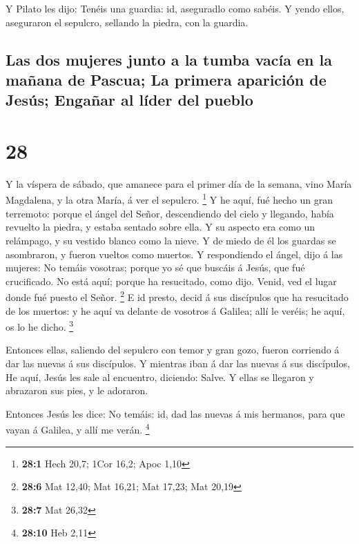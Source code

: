  Y Pilato les dijo: Tenéis una guardia: id, aseguradlo
como sabéis.  Y yendo ellos, aseguraron el sepulcro,
sellando la piedra, con la guardia.

\hypertarget{las-dos-mujeres-junto-a-la-tumba-vacuxeda-en-la-mauxf1ana-de-pascua-la-primera-apariciuxf3n-de-jesuxfas-engauxf1ar-al-luxedder-del-pueblo}{%
\subsection{Las dos mujeres junto a la tumba vacía en la mañana de
Pascua; La primera aparición de Jesús; Engañar al líder del
pueblo}\label{las-dos-mujeres-junto-a-la-tumba-vacuxeda-en-la-mauxf1ana-de-pascua-la-primera-apariciuxf3n-de-jesuxfas-engauxf1ar-al-luxedder-del-pueblo}}

\hypertarget{section-27}{%
\section{28}\label{section-27}}

 Y la víspera de sábado, que amanece para el primer día de
la semana, vino María Magdalena, y la otra María, á ver el sepulcro.
\footnote{\textbf{28:1} Hech 20,7; 1Cor 16,2; Apoc 1,10} 
Y he aquí, fué hecho un gran terremoto: porque el ángel del Señor,
descendiendo del cielo y llegando, había revuelto la piedra, y estaba
sentado sobre ella.  Y su aspecto era como un relámpago, y
su vestido blanco como la nieve.  Y de miedo de él los
guardas se asombraron, y fueron vueltos como muertos.  Y
respondiendo el ángel, dijo á las mujeres: No temáis vosotras; porque yo
sé que buscáis á Jesús, que fué crucificado.  No está
aquí; porque ha resucitado, como dijo. Venid, ved el lugar donde fué
puesto el Señor. \footnote{\textbf{28:6} Mat 12,40; Mat 16,21; Mat
  17,23; Mat 20,19}  E id presto, decid á sus discípulos
que ha resucitado de los muertos: y he aquí va delante de vosotros á
Galilea; allí le veréis; he aquí, os lo he dicho. \footnote{\textbf{28:7}
  Mat 26,32}

 Entonces ellas, saliendo del sepulcro con temor y gran
gozo, fueron corriendo á dar las nuevas á sus discípulos. Y mientras
iban á dar las nuevas á sus discípulos,  He aquí, Jesús
les sale al encuentro, diciendo: Salve. Y ellas se llegaron y abrazaron
sus pies, y le adoraron.

 Entonces Jesús les dice: No temáis: id, dad las nuevas á
mis hermanos, para que vayan á Galilea, y allí me verán. \footnote{\textbf{28:10}
  Heb 2,11}

